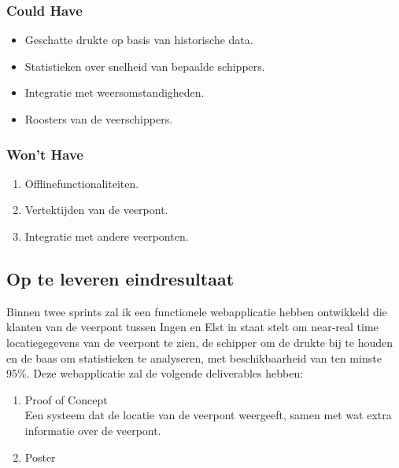 \documentclass{article}
\begin{document}
\subsubsection{Could Have}
\begin{itemize}
    \item Geschatte drukte op basis van historische data.
    \item Statistieken over snelheid van bepaalde schippers.
    \item Integratie met weersomstandigheden.
    \item Roosters van de veerschippers.
\end{itemize}
\subsubsection{Won't Have}
\begin{enumerate}
    \item Offlinefunctionaliteiten.
    \item Vertektijden van de veerpont.
    \item Integratie met andere veerponten.
\end{enumerate}

\subsection{Op te leveren eindresultaat}

Binnen twee sprints zal ik een functionele webapplicatie hebben ontwikkeld die klanten van de veerpont tussen Ingen en Elst in staat stelt om near-real time locatiegegevens van de veerpont te zien, de schipper om de drukte bij te houden en de baas om statistieken te analyseren, met beschikbaarheid van ten minste 95\%.
Deze webapplicatie zal de volgende deliverables hebben:
\begin{enumerate}
    \item Proof of Concept \\ Een systeem dat de locatie van de veerpont weergeeft, samen met wat extra informatie over de veerpont.
    \item Poster 
\end{enumerate}
\end{document}

